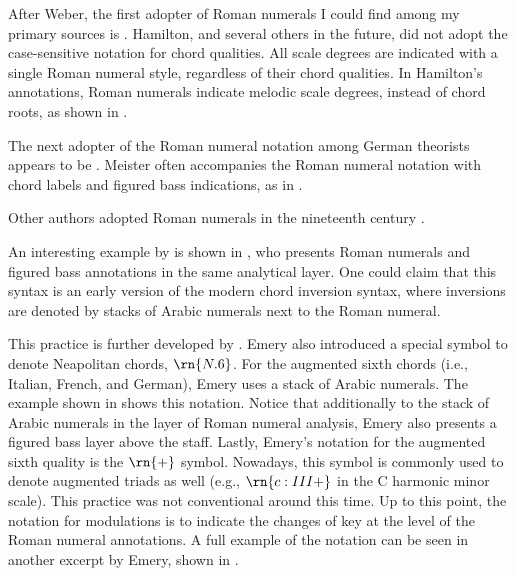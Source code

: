 After Weber, the first adopter of Roman numerals I could
find among my primary sources is
\textcite{hamilton1840catechism}. Hamilton, and several
others in the future, did not adopt the case-sensitive
notation for chord qualities. All scale degrees are
indicated with a single Roman numeral style, regardless of
their chord qualities. In Hamilton's annotations, Roman
numerals indicate melodic scale degrees, instead of chord
roots, as shown in
.


The next adopter of the Roman numeral notation among German
theorists appears to be \textcite{meister1852vollstandige}.
Meister often accompanies the Roman numeral notation with
chord labels and figured bass indications, as in
.


Other authors adopted Roman numerals in the nineteenth
century \parencite{sechter1853grundsatze,
richter1860lehrbuch, tiersch1874elementarbuch,
tracy1878theory}.

An interesting example by \textcite{bussler1878praktische}
is shown in
,
who presents Roman numerals and figured bass annotations in
the same analytical layer. One could claim that this syntax
is an early version of the modern chord inversion syntax,
where inversions are denoted by stacks of Arabic numerals
next to the Roman numeral.


This practice is further developed by
\textcite{emery1879elements}. Emery also introduced a
special symbol to denote Neapolitan chords, $\rn{N.6}$. For
the augmented sixth chords (i.e., Italian, French, and
German), Emery uses a stack of Arabic numerals. The example
shown in
 shows
this notation. Notice that additionally to the stack of
Arabic numerals in the layer of Roman numeral analysis,
Emery also presents a figured bass layer above the staff.
Lastly, Emery's notation for the augmented sixth quality is
the $\rn{+}$ symbol. Nowadays, this symbol is commonly used
to denote augmented triads as well (e.g., $\rn{c:III+}$ in
the C harmonic minor scale). This practice was not
conventional around this time. Up to this point, the
notation for modulations is to indicate the changes of key
at the level of the Roman numeral annotations. A full
example of the notation can be seen in another excerpt by
Emery, shown in
.

